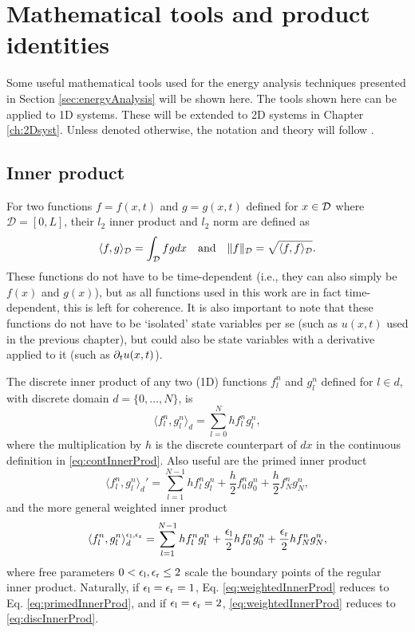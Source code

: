 \section{Mathematical tools and product identities}
Some useful mathematical tools used for the energy analysis techniques presented in Section \ref{sec:energyAnalysis} will be shown here. The tools shown here can be applied to 1D systems. These will be extended to 2D systems in Chapter \ref{ch:2Dsyst}. Unless denoted otherwise, the notation and theory will follow \cite{theBible}.

\subsection{Inner product}\label{sec:innerProduct}
For two functions $f = f(x,t)$ and $g = g(x,t)$ defined for $x\in\mathcal{D}$ where $\mathcal{D} = [0,L]$, their $l_2$ inner product and $l_2$ norm are defined as
\begin{equation}\label{eq:contInnerProd}
    \langle f, g\rangle_{\mathcal{D}} = \int_{\mathcal{D}} fg dx \quad \text{and} \quad \lVert f \rVert_{\mathcal{D}} = \sqrt{\langle f, f \rangle_{\mathcal{D}}}.
\end{equation}
These functions do not have to be time-dependent (i.e., they can also simply be $f(x)$ and $g(x)$), but as all functions used in this work are in fact time-dependent, this is left for coherence. It is also important to note that these functions do not have to be `isolated' state variables per se (such as $u(x,t)$ used in the previous chapter), but could also be state variables with a derivative applied to it (such as $\partial_t u(x,t)$). 

The discrete inner product of any two (1D) functions $f_l^n$ and $g_l^n$ defined for $l \in d$, with discrete domain $d = \{0,\hdots,N\}$, is
\begin{equation}\label{eq:discInnerProd}
    \langle f_l^n, g_l^n \rangle_d = \sum_{l = 0}^N h f_l^n g_l^n,
\end{equation}
where the multiplication by $h$ is the discrete counterpart of $dx$ in the continuous definition in \eqref{eq:contInnerProd}. 
Also useful are the primed inner product
\begin{equation}\label{eq:primedInnerProd}
    \langle f_l^n, g_l^n \rangle_d' = \sum_{l=1}^{N-1} h f_l^n g_l^n + \frac{h}{2}f_0^ng_0^n + \frac{h}{2}f_N^ng_N^n,
\end{equation}
and the more general weighted inner product
\begin{equation}\label{eq:weightedInnerProd}
    \langle f_l^n, g_l^n \rangle_d^{\epsilon_\text{l}, \epsilon_\text{r}} = \sum_{l=1}^{N-1} h f_l^n g_l^n + \frac{\epsilon_\text{l}}{2}hf_0^ng_0^n + \frac{\epsilon_\text{r}}{2}hf_N^ng_N^n,
\end{equation}
where free parameters $0 < \epsilon_\text{l}, \epsilon_\text{r} \leq 2$ scale the boundary points of the regular inner product. Naturally, if $\epsilon_\text{l} = \epsilon_\text{r} = 1$, Eq. \eqref{eq:weightedInnerProd} reduces to Eq. \eqref{eq:primedInnerProd}, and if $\epsilon_\text{l} = \epsilon_\text{r} = 2$, \eqref{eq:weightedInnerProd} reduces to \eqref{eq:discInnerProd}.

